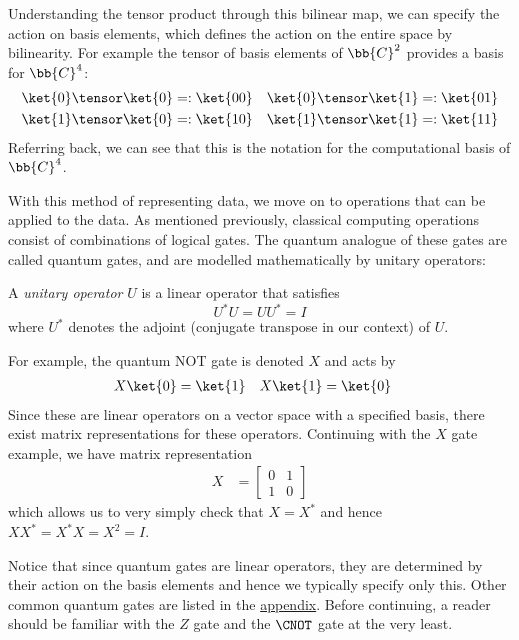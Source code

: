 \documentclass{article}
\begin{document}
        Understanding the tensor product through this bilinear map, we can specify the action on basis elements, which defines the action on the entire space by bilinearity.
        For example the tensor of basis elements of $\bb{C}^2$ provides a basis for $\bb{C}^4$:
        \begin{align*}
        \ket{0} \tensor \ket{0} &=: \ket{00} & \ket{0} \tensor \ket{1} &=: \ket{01}\\
        \ket{1} \tensor \ket{0} &=: \ket{10} & \ket{1} \tensor \ket{1} &=: \ket{11}
        \end{align*}
        Referring back, we can see that this is the notation for the computational basis of $\bb{C}^4$.

        With this method of representing data, we move on to operations that can be applied to the data.
        As mentioned previously, classical computing operations consist of combinations of logical gates.
        The quantum analogue of these gates are called quantum gates, and are modelled mathematically by unitary operators:

        \begin{definition}
                A \textit{unitary operator} $U$ is a linear operator that satisfies
                        $$U^* U = UU^* = I$$
                where $U^*$ denotes the adjoint (conjugate transpose in our context) of $U$.
        \end{definition}

        For example, the quantum NOT gate is denoted $X$ and acts by
        \begin{align*}
                X \ket{0} &= \ket{1} & X \ket{1} &= \ket{0}
        \end{align*}
        Since these are linear operators on a vector space with a specified basis, there exist matrix representations for these operators.
        Continuing with the $X$ gate example, we have matrix representation
        \begin{align*}
        X &= \begin{bmatrix} 0 & 1 \\ 1 & 0 \end{bmatrix}
        \end{align*}
        which allows us to very simply check that $X = X^*$ and hence $XX^* = X^* X = X^2 = I$.

        Notice that since quantum gates are linear operators, they are determined by their action on the basis elements and hence we typically specify only this.
        Other common quantum gates are listed in the \hyperref[appendix:code]{appendix}.
        Before continuing, a reader should be familiar with the $Z$ gate and the $\CNOT$ gate at the very least.
        
\end{document}
